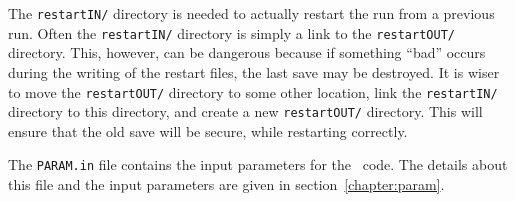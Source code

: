 The {\tt restartIN/} directory is needed to actually restart the run
from a previous run.  Often the {\tt restartIN/}
directory is simply a link to the {\tt restartOUT/} directory.  This, however,
can be dangerous because if something ``bad'' occurs during the
writing of the restart files, the last save may be destroyed.  It is
wiser to move the {\tt restartOUT/} directory to some other
location, link the {\tt restartIN/} directory to this directory, and
create a new {\tt restartOUT/} directory.  This will ensure that the
old save will be secure, while restarting correctly.

The {\tt PARAM.in} file contains the input parameters for the \BATSRUS\ 
code. The details about this file and the input parameters
are given in section~\ref{chapter:param}.
